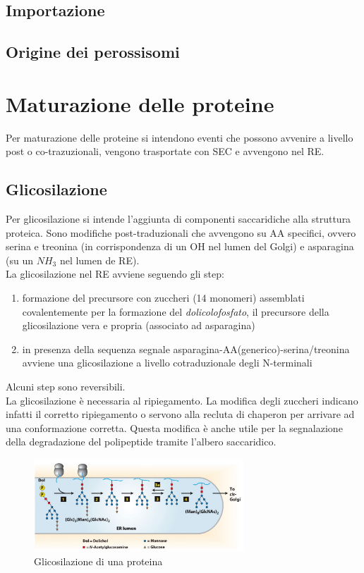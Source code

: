     \subsection{Importazione}
    \subsection{Origine dei perossisomi}

\section{Maturazione delle proteine}
    Per maturazione delle proteine si intendono eventi che possono avvenire a livello post o co-trazuzionali, vengono trasportate con SEC e avvengono nel RE.
    
    \subsection{Glicosilazione}
        Per glicosilazione si intende l'aggiunta di componenti saccaridiche alla struttura proteica. Sono modifiche post-traduzionali che avvengono su AA specifici, ovvero serina e treonina (in corrispondenza di un OH nel lumen del Golgi) e asparagina (su un $NH_{3}$ nel lumen de RE).  \\
        La glicosilazione nel RE avviene seguendo gli step:
        \begin{enumerate}
            \item formazione del precursore con zuccheri (14 monomeri) assemblati covalentemente per la formazione del \textit{dolicolofosfato}, il precursore della glicosilazione vera e propria (associato ad asparagina)
            \item in presenza della sequenza segnale asparagina-AA(generico)-serina/treonina avviene una glicosilazione a livello cotraduzionale degli N-terminali
        \end{enumerate}
        Alcuni step sono reversibili.\\
        La glicosilazione è necessaria al ripiegamento. La modifica degli zuccheri indicano infatti il corretto ripiegamento o servono alla recluta di chaperon per arrivare ad una conformazione corretta. Questa modifica è anche utile per la segnalazione della degradazione del polipeptide tramite l'albero saccaridico. 
        \begin{figure}[h]
            \centering
            \includegraphics[width=0.7\textwidth]{images/glicosilazine.JPG}
            \caption{\small Glicosilazione di una proteina}
            \label{fig:mesh1}
        \end{figure}
        

